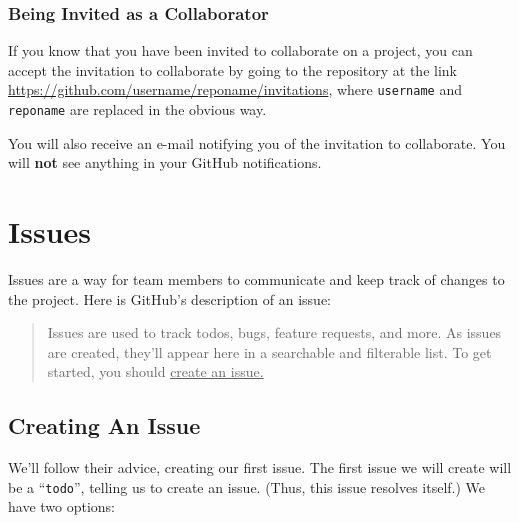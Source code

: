 \documentclass[11pt]{article}
\begin{document}
\subsubsection{Being Invited as a Collaborator}

If you know that you have been invited to collaborate on a project, you can accept the invitation to collaborate by going to the repository at the link \url{https://github.com/username/reponame/invitations}, where \texttt{username} and \texttt{reponame} are replaced in the obvious way. 

You will also receive an e-mail notifying you of the invitation to collaborate. You will \textbf{not} see anything in your GitHub notifications. 

\hypertarget{issues-section}{\section{Issues}}

Issues are a way for team members to communicate and keep track of changes to the project.  Here is GitHub's description of an issue:~\cite{github-issues} \\

\begin{quote}
Issues are used to track todos, bugs, feature requests, and more. As issues are created, they'll appear here in a searchable and filterable list. To get started, you should \underline{create an issue.}
\end{quote} 

\subsection{Creating An Issue}
We'll follow their advice, creating our first issue. The first issue we will create will be a ``\texttt{todo}'', telling us to create an issue. (Thus, this issue resolves itself.) We have two options: 
\end{document}
